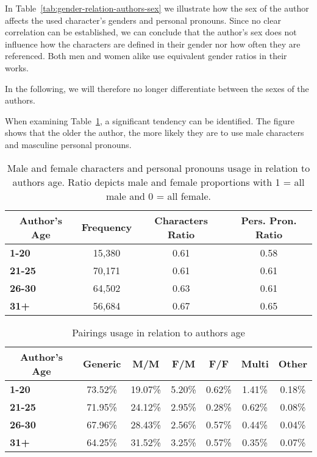 In Table~\ref{tab:gender-relation-authors-sex} we illustrate how the sex of the author affects the used character's genders and personal pronouns.
Since no clear correlation can be established, we can conclude that the author's sex does not influence how the characters are defined in their gender nor how often they are referenced.
Both men and women alike use equivalent gender ratios in their works.

In the following, we will therefore no longer differentiate between the sexes of the authors.

When examining Table~\ref{tab:gender-ratios-authors-age}, a significant tendency can be identified.
The figure shows that the older the author, the more likely they are to use male characters and masculine personal pronouns.

\begin{table}[htb]
    \renewcommand{\arraystretch}{1.5}
    \centering
    \begin{tabular}{lccc}
        \toprule
        \multicolumn{1}{c}{\textbf{Author's Age}} &
        \textbf{Frequency} &
        \textbf{Characters Ratio} &
        \textbf{Pers. Pron. Ratio} \\
        \midrule
        \textbf{1-20}  & 15,380 & 0.61 & 0.58 \\
        \textbf{21-25} & 70,171 & 0.61 & 0.61 \\
        \textbf{26-30} & 64,502 & 0.63 & 0.61 \\
        \textbf{31+}   & 56,684 & 0.67 & 0.65 \\
        \bottomrule
    \end{tabular}
    \caption[Male and female characters and personal pronouns usage in relation to authors age.]{Male and female characters and personal pronouns usage in relation to authors age. Ratio depicts male and female proportions with 1 = all male and 0 = all female.}
    \label{tab:gender-ratios-authors-age}
\end{table}

\begin{table}[htb]
    \renewcommand{\arraystretch}{1.5}
    \centering
    \begin{tabular}{lcccccc}
        \toprule
        \multicolumn{1}{c}{\textbf{Author's Age}} &
        \textbf{Generic} &
        \textbf{M/M} &
        \textbf{F/M} &
        \textbf{F/F} &
        \textbf{Multi} &
        \textbf{Other} \\
        \midrule
        \textbf{1-20}  & 73.52\% & 19.07\% & 5.20\% & 0.62\% & 1.41\% & 0.18\% \\
        \textbf{21-25} & 71.95\% & 24.12\% & 2.95\% & 0.28\% & 0.62\% & 0.08\% \\
        \textbf{26-30} & 67.96\% & 28.43\% & 2.56\% & 0.57\% & 0.44\% & 0.04\% \\
        \textbf{31+}   & 64.25\% & 31.52\% & 3.25\% & 0.57\% & 0.35\% & 0.07\% \\
        \bottomrule
    \end{tabular}
    \caption{Pairings usage in relation to authors age}
    \label{tab:gender-pairings-authors-age}
\end{table}


